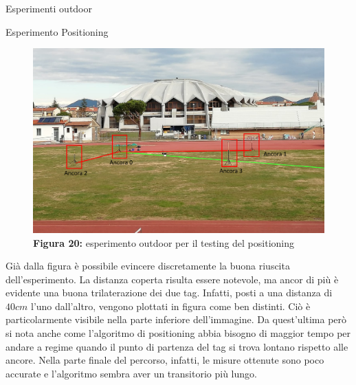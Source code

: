 \documentclass[12pt]{report}
\begin{document}
\begin{section}{Esperimenti outdoor}
\begin{subsection}{Esperimento Positioning}
			\begin{figure}[H]
				\centering
				\includegraphics[scale=0.33]{EspOutConfig}
	 			\caption{\textbf{Figura 20:} esperimento outdoor per il testing del positioning\label{EspOutConfig}}
			\end{figure}
			Già dalla figura è possibile evincere discretamente la buona riuscita dell'esperimento. La distanza coperta risulta essere notevole, ma ancor di più è evidente una buona trilaterazione dei due tag. Infatti, posti a una distanza di $40 cm$ l'uno dall'altro, vengono plottati in figura come ben distinti. Ciò è 									particolarmente visibile nella parte inferiore dell'immagine. Da quest'ultima però si nota anche come l'algoritmo di positioning abbia bisogno di maggior tempo per andare a regime quando il punto di partenza del tag si trova lontano rispetto alle ancore. Nella parte finale del percorso, infatti, le misure ottenute 					sono poco accurate e l'algoritmo sembra aver un transitorio più lungo.


\end{subsection}
\end{section}
\end{document}
